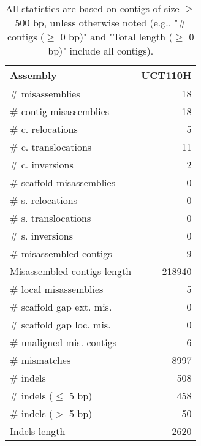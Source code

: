 \documentclass[12pt,a4paper]{article}
\begin{document}
\begin{table}[ht]
\begin{center}
\caption{All statistics are based on contigs of size $\geq$ 500 bp, unless otherwise noted (e.g., "\# contigs ($\geq$ 0 bp)" and "Total length ($\geq$ 0 bp)" include all contigs).}
\begin{tabular}{|l*{1}{|r}|}
\hline
Assembly & UCT110H \\ \hline
\# misassemblies & 18 \\ \hline
\hspace{2mm}\# contig misassemblies & 18 \\ \hline
\hspace{5mm}\# c. relocations & 5 \\ \hline
\hspace{5mm}\# c. translocations & 11 \\ \hline
\hspace{5mm}\# c. inversions & 2 \\ \hline
\hspace{2mm}\# scaffold misassemblies & 0 \\ \hline
\hspace{5mm}\# s. relocations & 0 \\ \hline
\hspace{5mm}\# s. translocations & 0 \\ \hline
\hspace{5mm}\# s. inversions & 0 \\ \hline
\# misassembled contigs & 9 \\ \hline
Misassembled contigs length & 218940 \\ \hline
\# local misassemblies & 5 \\ \hline
\# scaffold gap ext. mis. & 0 \\ \hline
\# scaffold gap loc. mis. & 0 \\ \hline
\# unaligned mis. contigs & 6 \\ \hline
\# mismatches & 8997 \\ \hline
\# indels & 508 \\ \hline
\hspace{5mm}\# indels ($\leq$ 5 bp) & 458 \\ \hline
\hspace{5mm}\# indels ($>$ 5 bp) & 50 \\ \hline
Indels length & 2620 \\ \hline
\end{tabular}
\end{center}
\end{table}
\end{document}
